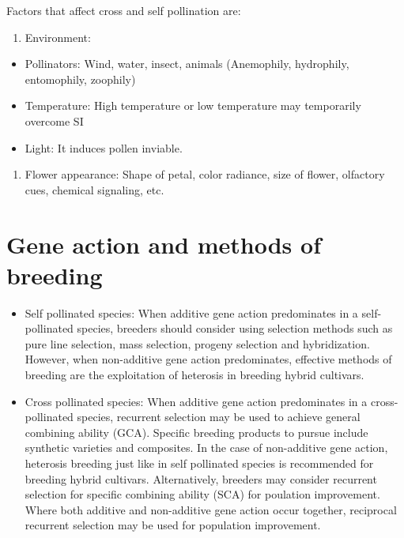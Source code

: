 \documentclass[
  openany]{book}
\providecommand{\tightlist}{%
  \setlength{\itemsep}{0pt}\setlength{\parskip}{0pt}}
\begin{document}
Factors that affect cross and self pollination are:

\begin{enumerate}
\def\labelenumi{\arabic{enumi}.}
\tightlist
\item
  Environment:
\end{enumerate}

\begin{itemize}
\tightlist
\item
  Pollinators: Wind, water, insect, animals (Anemophily, hydrophily, entomophily, zoophily)
\item
  Temperature: High temperature or low temperature may temporarily overcome SI
\item
  Light: It induces pollen inviable.
\end{itemize}

\begin{enumerate}
\def\labelenumi{\arabic{enumi}.}
\setcounter{enumi}{1}
\tightlist
\item
  Flower appearance: Shape of petal, color radiance, size of flower, olfactory cues, chemical signaling, etc.
\end{enumerate}

\hypertarget{gene-action-and-methods-of-breeding}{%
\section{Gene action and methods of breeding}\label{gene-action-and-methods-of-breeding}}

\begin{itemize}
\item
  Self pollinated species: When additive gene action predominates in a self-pollinated species, breeders should consider using selection methods such as pure line selection, mass selection, progeny selection and hybridization. However, when non-additive gene action predominates, effective methods of breeding are the exploitation of heterosis in breeding hybrid cultivars.
\item
  Cross pollinated species: When additive gene action predominates in a cross-pollinated species, recurrent selection may be used to achieve general combining ability (GCA). Specific breeding products to pursue include synthetic varieties and composites. In the case of non-additive gene action, heterosis breeding just like in self pollinated species is recommended for breeding hybrid cultivars. Alternatively, breeders may consider recurrent selection for specific combining ability (SCA) for poulation improvement. Where both additive and non-additive gene action occur together, reciprocal recurrent selection may be used for population improvement.
\end{itemize}
\end{document}
